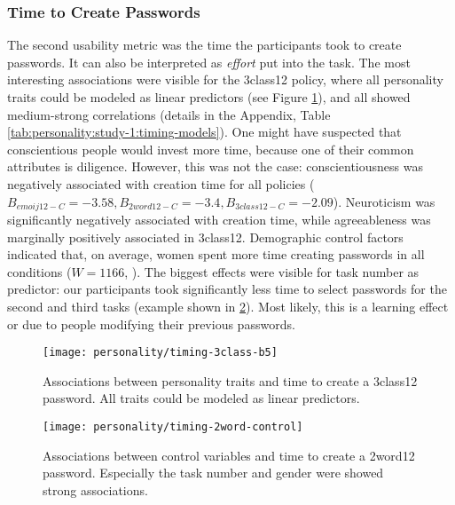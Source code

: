 \subsubsection{Time to Create Passwords}
The second usability metric was the time the participants took to create passwords. It can also be interpreted as \textit{effort} put into the task. The most interesting associations were visible for the 3class12 policy, where all personality traits could be modeled as linear predictors (see Figure \ref{fig:personality:timing-3class-b5}), and all showed medium-strong correlations (details in the Appendix, Table \ref{tab:personality:study-1:timing-models}). One might have suspected that conscientious people would invest more time, because one of their common attributes is diligence. However, this was not the case: conscientiousness was negatively associated with creation time for all policies ($B_{emoij12-C}=-3.58,B_{2word12-C}=-3.4,B_{3class12-C}=-2.09$). Neuroticism was significantly negatively associated with creation time, while agreeableness was marginally positively associated in 3class12. Demographic control factors indicated that, on average, women spent more time creating passwords in all conditions ($W=1166$, ). The biggest effects were visible for task number as predictor: our participants took significantly less time to select passwords for the second and third tasks (example shown in \ref{fig:personality:timing-2word-control}). Most likely, this is a learning effect or due to people modifying their previous passwords. 


\begin{figure}
	\texttt{[image: personality/timing-3class-b5]}
	\caption{\label{fig:personality:timing-3class-b5}Associations between personality traits and time to create a 3class12 password. All traits could be modeled as linear predictors.}
\end{figure}

\begin{figure}
	\texttt{[image: personality/timing-2word-control]}
	\caption{\label{fig:personality:timing-2word-control}Associations between control variables and time to create a 2word12 password. Especially the task number and gender were showed strong associations.}
\end{figure}




